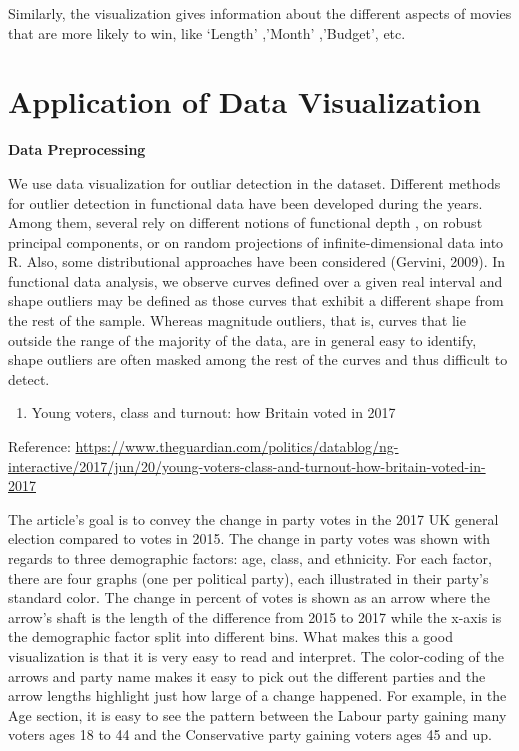 \documentclass[]{book}
\providecommand{\tightlist}{%
  \setlength{\itemsep}{0pt}\setlength{\parskip}{0pt}}
\theoremstyle{definition}
\theoremstyle{definition}
\theoremstyle{definition}
\theoremstyle{remark}
\begin{document}
Similarly, the visualization gives information about the different
aspects of movies that are more likely to win, like `Length' ,'Month'
,'Budget', etc.

\section{Application of Data
Visualization}\label{application-of-data-visualization}

\textbf{Data Preprocessing}

We use data visualization for outliar detection in the dataset.
Different methods for outlier detection in functional data have been
developed during the years. Among them, several rely on different
notions of functional depth , on robust principal components, or on
random projections of infinite-dimensional data into R. Also, some
distributional approaches have been considered (Gervini, 2009). In
functional data analysis, we observe curves defined over a given real
interval and shape outliers may be defined as those curves that exhibit
a different shape from the rest of the sample. Whereas magnitude
outliers, that is, curves that lie outside the range of the majority of
the data, are in general easy to identify, shape outliers are often
masked among the rest of the curves and thus difficult to detect.

\citep{outliar}

\begin{enumerate}
\def\labelenumi{\arabic{enumi}.}
\setcounter{enumi}{7}
\tightlist
\item
  Young voters, class and turnout: how Britain voted in 2017
\end{enumerate}

Reference:
\url{https://www.theguardian.com/politics/datablog/ng-interactive/2017/jun/20/young-voters-class-and-turnout-how-britain-voted-in-2017}

The article's goal is to convey the change in party votes in the 2017 UK
general election compared to votes in 2015. The change in party votes
was shown with regards to three demographic factors: age, class, and
ethnicity. For each factor, there are four graphs (one per political
party), each illustrated in their party's standard color. The change in
percent of votes is shown as an arrow where the arrow's shaft is the
length of the difference from 2015 to 2017 while the x-axis is the
demographic factor split into different bins. What makes this a good
visualization is that it is very easy to read and interpret. The
color-coding of the arrows and party name makes it easy to pick out the
different parties and the arrow lengths highlight just how large of a
change happened. For example, in the Age section, it is easy to see the
pattern between the Labour party gaining many voters ages 18 to 44 and
the Conservative party gaining voters ages 45 and up.
\end{document}
